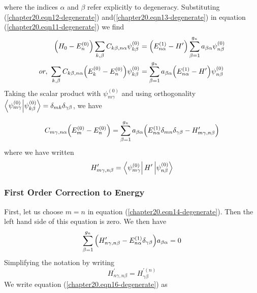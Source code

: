 	where the indices $\alpha$ and $\beta$ refer explicitly to degeneracy. Substituting (\ref{chapter20.eqn12-degenerate}) and(\ref{chapter20.eqn13-degenerate}) in equation (\ref{chapter20.eqn11-degenerate}) we find
	\begin{align}
		\qty(H_0 - E_n^{(0)}) \sum_{k,\beta} C_{k\beta, n\alpha} \psi_{k \beta}^{(0)} 
		&= \qty(E_{n\alpha}^{(1)} - H^\prime) \sum_{\beta=1}^{g_n} a_{\beta\alpha} \psi_{n\beta}^{(0)} \\
		or,\ \sum_{k,\beta} C_{k\beta, n\alpha} \qty(E_k^{(0)} - E_n^{(0)}) \psi_{k \beta}^{(0)} 
		&= \sum_{\beta=1}^{g_n} a_{\beta\alpha} \qty(E_{n\alpha}^{(1)} - H^\prime) \psi_{n\beta}^{(0)} 
	\end{align}
	Taking the scalar product with $\psi_{m\gamma}^{(0)}$ and using orthogonality $\braket{\psi_{m\gamma}^{(0)}}{\psi_{k\beta}^{(0)}} = \delta_{m k} \delta_{\gamma \beta}$, we have
	
	\begin{equation}
		C_{m\gamma, n\alpha} \qty(E_m^{(0)} - E_n^{(0)}) = \sum_{\beta=1}^{g_n} a_{\beta\alpha} \qty(E_{n\alpha}^{(1)}\delta_{mn}\delta_{\gamma\beta}  -  H^\prime_{m\gamma,n\beta})
		\label{chapter20.eqn14-degenerate}
	\end{equation}
	where we have written
	\begin{equation}
		H^\prime_{m\gamma,n\beta} = \bra{\psi_{m\gamma}^{(0)}} H^\prime \ket{\psi_{n\beta}^{(0)}}
		\label{chapter20.eqn15-degenerate}
	\end{equation}
	
	\subsubsection{First Order Correction to Energy}
	
	First, let us choose $m=n$ in equation (\ref{chapter20.eqn14-degenerate}). Then the left hand side of this equation is zero. We then have
	\begin{equation}
		\sum_{\beta=1}^{g_n} \qty(H^\prime_{n\gamma,n \beta}  -  E_{n\alpha}^{(1)}\delta_{\gamma \beta}) a_{\beta \alpha} = 0
		\label{chapter20.eqn16-degenerate}
	\end{equation}
	Simplifying the notation by writing
	\begin{equation}
		H^\prime_{n\gamma, n\beta} = H^{\prime (n)}_{\gamma\beta}
	\end{equation}
	We write equation (\ref{chapter20.eqn16-degenerate}) as
	

